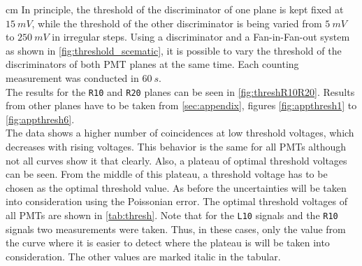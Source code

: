  cm
In principle, the threshold of the discriminator of one plane is kept fixed at $\SI{15}{mV}$, while 
the threshold of the other discriminator is being varied from $\SI{5}{mV}$ to $\SI{250}{mV}$ in irregular steps. 
Using a discriminator and a Fan-in-Fan-out system as shown in \autoref{fig:threshold_scematic}, it is possible to vary the threshold of the discriminators of both PMT planes at the same time. Each counting measurement was conducted in $\SI{60}{s}$.\\ 
The results for the \texttt{R10} and \texttt{R20} planes can be seen in \autoref{fig:threshR10R20}.
Results from other planes have to be taken from \autoref{sec:appendix}, figures \autoref{fig:appthresh1} to \autoref{fig:appthresh6}.\\

The data shows a higher number of coincidences at low threshold voltages, which decreases with rising voltages.
This behavior is the same for all PMTs although not all curves show it that clearly.  
Also, a plateau of optimal threshold voltages can be seen. From the middle of this plateau, a threshold voltage 
has to be chosen as the optimal threshold value. As before the uncertainties will be taken 
into consideration using the Poissonian error. The optimal threshold voltages of all PMTs are shown in 
\autoref{tab:thresh}.
Note that for the \texttt{L10} signals and the \texttt{R10} signals two measurements 
were taken. Thus, in these cases, only the value from the curve where it is easier to detect
where the plateau is will be taken into consideration.
The other values are marked italic in the tabular.
